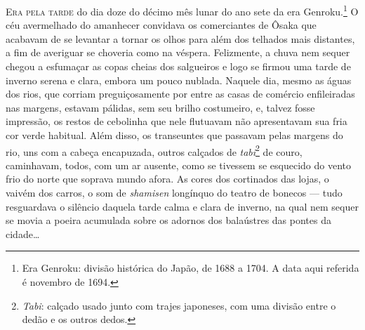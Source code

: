 \noindent\textsc{Era pela tarde} do dia doze do décimo mês lunar do ano sete da era
Genroku.\footnote{ Era Genroku: divisão histórica do Japão, de 1688 a 1704. 
A data aqui referida é novembro de 1694.} O céu avermelhado do amanhecer
convidava os comerciantes de Ôsaka que acabavam de se levantar a tornar
os olhos para além dos telhados mais distantes, a fim de averiguar se
choveria como na véspera. Felizmente, a chuva nem sequer chegou a
esfumaçar as copas cheias dos salgueiros e logo se firmou uma tarde de
inverno serena e clara, embora um pouco nublada. Naquele dia, mesmo as
águas dos rios, que corriam preguiçosamente por entre as casas de
comércio enfileiradas nas margens, estavam pálidas, sem seu brilho
costumeiro, e, talvez fosse impressão, os restos de cebolinha que nele
flutuavam não apresentavam sua fria cor verde habitual. Além disso, os
transeuntes que passavam pelas margens do rio, uns com a cabeça
encapuzada, outros calçados de \textit{tabi}\footnote{ \textit{Tabi}:
calçado usado junto com trajes japoneses, com uma divisão entre o dedão
e os outros dedos.} de couro, caminhavam, todos, com um ar ausente,
como se tivessem se esquecido do vento frio do norte que soprava mundo
afora. As cores dos cortinados das lojas, o vaivém dos carros, o som de
\textit{shamisen} longínquo do teatro de bonecos --- tudo resguardava o
silêncio daquela tarde calma e clara de inverno, na qual nem sequer se
movia a poeira acumulada sobre os adornos dos balaústres das pontes da cidade\ldots{}

